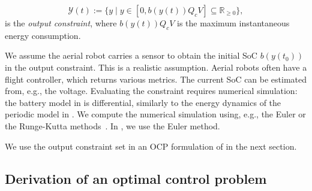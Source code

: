 \begin{defn}
  \label{def:const}
  \begin{equation*}
    \mathcal{Y}(t):=\{y\mid y\in[0,b(y(t))Q_cV]\subseteq{\mathbb{R}_{\geq 0}}\},
  \end{equation*}
  is the \emph{output constraint}, where $b(y(t))Q_cV$ is the maximum instantaneous energy consumption.
\end{defn}

We assume the aerial robot carries a sensor to obtain the initial SoC $b(y(t_0))$ in the output constraint. This is a realistic assumption. Aerial robots often have a flight controller, which returns various metrics. The current SoC can be estimated from, e.g., the voltage. Evaluating the constraint requires numerical simulation: the battery model in  is differential, similarly to the energy dynamics of the periodic model in . We compute the numerical simulation using, e.g., the Euler or the Runge-Kutta methods~\citep{iserles2009first}. In , we use the Euler method.

We use the output constraint set in an OCP formulation of  in the next section.

\subsection{Derivation of an optimal control problem}
\label{sec:mpc-deriv-ocp}

